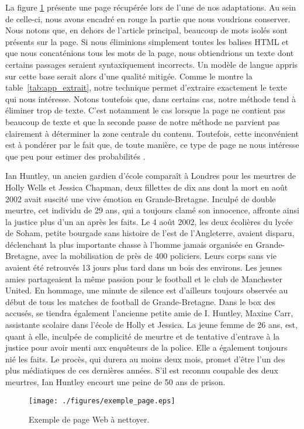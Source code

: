 La figure \ref{fig:exemple-page} présente une page récupérée lors de l'une de
nos adaptations. Au sein de
celle-ci, nous avons encadré en rouge la partie que nous voudrions conserver.
Nous notons que, en dehors de l'article principal, beaucoup de mots isolés sont
présents sur la page. Si nous éliminions simplement toutes les balises HTML et
que nous concaténions tous les mots de la page, nous obtiendrions un texte dont
certains passages seraient syntaxiquement incorrects. Un modèle de langue appris
sur cette base serait alors d'une qualité mitigée. Comme le montre la
table~\ref{tab:app_extrait}, notre technique permet d'extraire exactement le
texte qui nous intéresse. Notons toutefois que, dans certains cas, notre méthode
tend à éliminer trop de texte. C'est notamment le cas lorsque la page ne
contient pas beaucoup de texte et que la seconde passe de notre méthode ne
parvient pas clairement à déterminer la zone centrale du contenu. Toutefois,
cette inconvénient est à pondérer par le fait que, de toute manière, ce type de
page ne nous intéresse que peu pour estimer des probabilités \ngrammes{}.


\begin{table}
\centering
\begin{minipage}{0.80\linewidth}
\begin{small}
\sffamily{}
Ian Huntley, un ancien gardien d'école comparaît à Londres pour les meurtres de
Holly Wells et Jessica Chapman, deux fillettes de dix ans dont la mort en août
2002 avait suscité une vive émotion en Grande-Bretagne. Inculpé de double
meurtre, cet individu de 29 ans, qui a toujours clamé son innocence, affronte
ainsi la justice plus d'un an après les faits. Le 4 août 2002, les deux
écolières du lycée de Soham, petite bourgade sans histoire de l'est de
l'Angleterre, avaient disparu, déclenchant la plus importante chasse à l'homme
jamais organisée en Grande-Bretagne, avec la mobilisation de près de 400
policiers. Leurs corps sans vie avaient été retrouvés 13 jours plus tard dans un
bois des environs. Les jeunes amies partageaient la même passion pour le
football et le club de Manchester United. En hommage, une minute de silence est
d'ailleurs toujours observée au début de tous les matches de football de
Grande-Bretagne. Dans le box des accusés, se tiendra également l'ancienne petite
amie de I. Huntley, Maxine Carr, assistante scolaire dans l'école de Holly et
Jessica. La jeune femme de 26 ans, est, quant à elle, inculpée de complicité de
meurtre et de tentative d'entrave à la justice pour avoir menti aux enquêteurs
de la police. Elle a également toujours nié les faits. Le procès, qui durera au
moins deux mois, promet d'être l'un des plus médiatiques de ces dernières
années. S'il est reconnu coupable des deux meurtres, Ian Huntley encourt une
peine de 50 ans de prison.
\end{small}
\end{minipage}
\caption{Texte extrait à partir de la page présentée en
figure~\ref{fig:exemple-page}.}
\label{tab:app_extrait}
\end{table}


\begin{figure}[p!]
   \centering
   \texttt{[image: ./figures/exemple\_page.eps]}
	 \caption{Exemple de page Web à nettoyer.}
   \label{fig:exemple-page}
\end{figure}




